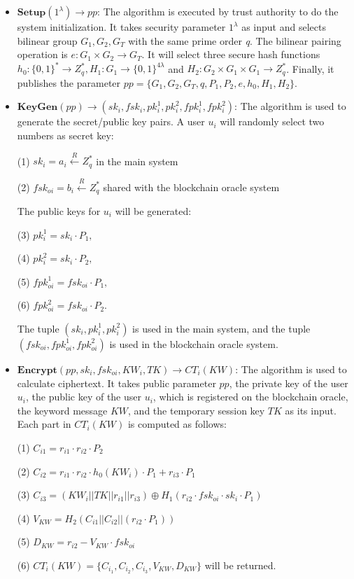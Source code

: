 \documentclass[journal,10pt]{IEEEtran}
\begin{document}
\begin{itemize}
    \item $ \boldsymbol{Setup}(1^\lambda) \to pp $: 
    The algorithm is executed by trust authority to do the system initialization. It takes security parameter $1^\lambda$ as input 
    and selects bilinear group ${G_1, G_2, G_T}$ with the same prime order \emph{q}. 
    The bilinear pairing operation is ${e:G_1\times G_2 \to G_T}$.
    It will select three secure hash functions $h_0:\{0,1\}^* \to Z_q^*, H_1: G_1 \to \{0,1\}^{4\lambda}$ and $H_2:G_2 \times G_1 \times G_1 \to Z_q^*$.
    Finally, it publishes the parameter $pp = \{G_1, G_2, G_T, q, P_1, P_2, e, h_0, H_1, H_2\}$.
    
    \item $ \boldsymbol{KeyGen}(pp) \to (sk_i, fsk_i, pk_i^1, pk_i^2, fpk_i^1, fpk_i^2) $: The algorithm is used to generate the secret/public key pairs. A user $u_i$ will randomly select two numbers as secret key:
    
    (1) $sk_i = a_i \xleftarrow{R} Z_q^*$ in the main system
    
    (2) $fsk_{oi} = b_i \xleftarrow{R} Z_q^*$ shared with the blockchain oracle system
    
    The public keys for $u_i$ will be generated: 
    
    (3) $pk_i^1 = sk_i \cdot P_1, $
    
    (4) $pk_i^2 = sk_i \cdot P_2, $
    
    (5) $fpk_{oi}^1 = fsk_{oi} \cdot P_1,$
    
    (6) $fpk_{oi}^2 = fsk_{oi} \cdot P_2$. 
    
    The tuple $(sk_i, pk_i^1, pk_i^2)$ is used in the main system, and the tuple $(fsk_{oi}, fpk_{oi}^1, fpk_{oi}^2)$ is used in the blockchain oracle system.
    
\end{itemize}

\begin{itemize}
    \item $ \boldsymbol{Encrypt}(pp, sk_i, fsk_{oi}, KW_i, TK) \to CT_i(KW) $: The algorithm is used to calculate ciphertext. It takes public parameter $pp$, the private key of the user $u_i$, the public key of the user $u_i$, which is registered on the blockchain oracle, the keyword message $KW$, and the temporary session key $TK$ as its input. Each part in $CT_i(KW)$ is computed as follows: 
    
    (1) $C_{i1} = r_{i1} \cdot r_{i2} \cdot P_2$
    
    (2) $C_{i2} = r_{i1} \cdot r_{i2} \cdot h_0(KW_i) \cdot P_1 + r_{i3} \cdot P_1$ 
    
    (3) $C_{i3} = (KW_i||TK||r_{i1}||r_{i3}) \oplus H_1(r_{i2} \cdot fsk_{oi} \cdot sk_i \cdot P_1)$
    
    (4) $V_{KW} = H_2(C_{i1}||C_{i2}||(r_{i2} \cdot P_1))$
    
    (5) $D_{KW} = r_{i2}-V_{KW} \cdot fsk_{oi}$
    
    (6) $CT_i(KW) = \{C_{i_1}, C_{i_2}, C_{i_3}, V_{KW}, D_{KW}\}$ will be returned.
\end{itemize}
\end{document}
